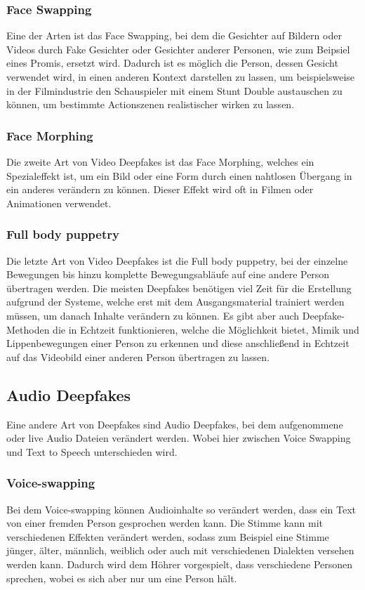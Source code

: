 \subsubsection{Face Swapping}
Eine der Arten ist das Face Swapping, bei dem die Gesichter auf Bildern oder Videos durch Fake Gesichter oder Gesichter anderer Personen, wie zum Beipsiel eines Promis, ersetzt wird.
Dadurch ist es möglich die Person, dessen Gesicht verwendet wird, in einen anderen Kontext darstellen zu lassen, um beispielsweise in der Filmindustrie den Schauspieler mit einem Stunt Double austauschen zu können, um bestimmte Actionszenen realistischer wirken zu lassen.\cite{ResearchGate}

\subsubsection{Face Morphing}
Die zweite Art von Video Deepfakes ist das Face Morphing, welches ein Spezialeffekt ist, um ein Bild oder eine Form durch einen nahtlosen Übergang in ein anderes verändern zu können. Dieser Effekt wird oft in Filmen oder Animationen verwendet.\cite{ResearchGate}

\subsubsection{Full body puppetry}
Die letzte Art von Video Deepfakes ist die Full body puppetry, bei der einzelne Bewegungen bis hinzu komplette
Bewegungsabläufe auf eine andere Person übertragen werden.\newline
Die meisten Deepfakes benötigen viel Zeit für die Erstellung aufgrund der Systeme, welche erst mit dem Ausgangsmaterial trainiert werden müssen, um danach Inhalte verändern zu können.
Es gibt aber auch Deepfake-Methoden die in Echtzeit funktionieren, welche die Möglichkeit bietet, Mimik und Lippenbewegungen einer Person zu erkennen und diese anschließend in Echtzeit auf das Videobild einer anderen Person übertragen zu lassen.\cite{ResearchGate}

\subsection{Audio Deepfakes}
Eine andere Art von Deepfakes sind Audio Deepfakes, bei dem aufgenommene oder live Audio Dateien verändert werden. Wobei hier zwischen Voice Swapping und Text to Speech unterschieden wird.\cite{ResearchGate}

\subsubsection{Voice-swapping}
Bei dem Voice-swapping können Audioinhalte so verändert werden, dass ein Text von einer fremden Person gesprochen werden kann. Die Stimme kann mit verschiedenen Effekten verändert werden, sodass zum Beispiel eine Stimme jünger, älter, männlich, weiblich oder auch mit verschiedenen Dialekten versehen werden kann.
Dadurch wird dem Höhrer vorgespielt, dass verschiedene Personen sprechen, wobei es sich aber nur um eine Person hält.\cite{ResearchGate}

